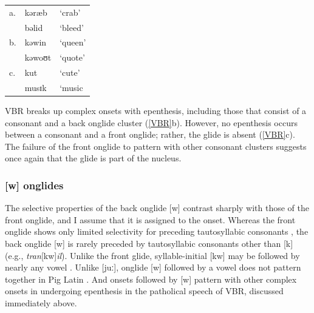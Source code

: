 \begin{example} \label{VBR}
\begin{tabular}{l l l}
a. & kəræb  & `crab'  \\
   & bəlid  & `bleed' \\
b. & kəwin  & `queen' \\
   & kəwoʊt & `quote' \\
c. & kut    & `cute'  \\
   & musɪk  & `music  \\ 
\end{tabular}
\end{example}

\noindent
VBR breaks up complex onsets with epenthesis, including those that consist of a consonant and a back onglide cluster (\ref{VBR}b). However, no epenthesis occurs between a consonant and a front onglide; rather, the glide is absent (\ref{VBR}c). The failure of the front onglide to pattern with other consonant clusters suggests once again that the glide is part of the nucleus. 


\subsubsection{[w] onglides}

The selective properties of the back onglide [w] contrast sharply with those of the front onglide, and I assume that it is assigned to the onset. Whereas the front onglide shows only limited selectivity for preceding tautosyllabic consonants \citep{Davis1995,Kaye1996}, the back onglide [w] is rarely preceded by tautosyllabic consonants other than [k] (e.g., \emph{tran}[kw]\emph{il}). Unlike the front glide, syllable-initial [kw] may be followed by nearly any vowel \citep[][161]{Davis1995}. Unlike [juː], onglide [w] followed by a vowel does not pattern together in Pig Latin \citep[][166]{Davis1995}. And onsets followed by [w] pattern with other complex onsets in undergoing epenthesis in the patholical speech of VBR, discussed immediately above.


